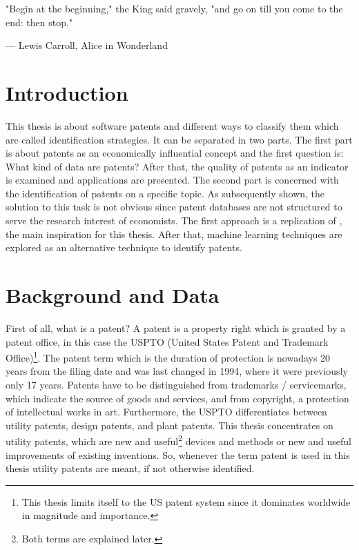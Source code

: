 \documentclass[12pt, a4paper, abstract, parskip]{scrartcl}
\theoremstyle{definition}
\begin{document}
\newpage
\tableofcontents

\newpage


\epigraph{"Begin at the beginning," the King said gravely, "and go on till you
come to the end: then stop."}{--- \textup{Lewis Carroll}, Alice in Wonderland}

\section{Introduction}
\label{sec:introduction}

This thesis is about software patents and different ways to classify them which
are called identification strategies. It can be separated in two parts. The
first part is about patents as an economically influential concept and the
first question is: What kind of data are patents? After that, the quality of
patents as an indicator is examined and applications are presented. The second
part is concerned with the identification of patents on a specific topic. As
subsequently shown, the solution to this task is not obvious since patent
databases are not structured to serve the research interest of economists. The
first approach is a replication of \citet{bessen2007empirical}, the main
inspiration for this thesis. After that, machine learning techniques are
explored as an alternative technique to identify patents.



\section{Background and Data} %
\label{sec:background_and_data}

First of all, what is a patent? A patent is a property right which is granted
by a patent office, in this case the USPTO (United States Patent and Trademark
Office)\footnote{This thesis limits itself to the US patent system since it
dominates worldwide in magnitude and importance.}. The patent term which is the
duration of protection is nowadays 20 years from the filing date and was last
changed in 1994, where it were previously only 17 years. Patents have to be
distinguished from trademarks / servicemarks, which indicate the source of
goods and services, and from copyright, a protection of intellectual works in
art. Furthermore, the USPTO differentiates between utility patents, design
patents, and plant patents. This thesis concentrates on utility patents, which
are new and useful\footnote{Both terms are explained later.} devices and
methods or new and useful improvements of existing inventions. So, whenever the
term patent is used in this thesis utility patents are meant, if not otherwise
identified.
\end{document}
